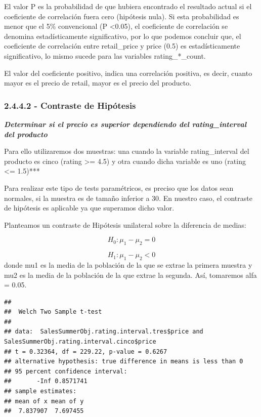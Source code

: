 \documentclass[
]{article}
\newenvironment{Shaded}{\begin{snugshade}}{\end{snugshade}}
\newcommand{\DataTypeTok}[1]{\textcolor[rgb]{0.13,0.29,0.53}{#1}}
\newcommand{\KeywordTok}[1]{\textcolor[rgb]{0.13,0.29,0.53}{\textbf{#1}}}
\newcommand{\NormalTok}[1]{#1}
\newcommand{\OperatorTok}[1]{\textcolor[rgb]{0.81,0.36,0.00}{\textbf{#1}}}
\newcommand{\StringTok}[1]{\textcolor[rgb]{0.31,0.60,0.02}{#1}}
\begin{document}
El valor P es la probabilidad de que hubiera encontrado el resultado
actual si el coeficiente de correlación fuera cero (hipótesis nula). Si
esta probabilidad es menor que el 5\% convencional (P \textless0.05), el
coeficiente de correlación se denomina estadísticamente significativo,
por lo que podemos concluir que, el coeficiente de correlación entre
retail\_price y price (0.5) es estadísticamente significativo, lo mismo
sucede para las variables rating\_*\_count.

El valor del coeficiente positivo, indica una correlación positiva, es
decir, cuanto mayor es el precio de retail, mayor es el precio del
producto.

\hypertarget{contraste-de-hipuxf3tesis}{%
\subsubsection{2.4.4.2 - Contraste de
Hipótesis}\label{contraste-de-hipuxf3tesis}}

\textbf{\emph{Determinar si el precio es superior dependiendo del
rating\_interval del producto}}

Para ello utilizaremos dos muestras: una cuando la variable
rating\_interval del producto es cinco (rating \textgreater= 4.5) y otra
cuando dicha variable es uno (rating \textless= 1.5)***

Para realizar este tipo de tests paramétricos, es preciso que los datos
sean normales, si la muestra es de tamaño inferior a 30. En nuestro
caso, el contraste de hipótesis es aplicable ya que superamos dicho
valor.

Planteamos un contraste de Hipótesis unilateral sobre la diferencia de
medias:

\[
  H_{0}: \mu_{1} - \mu_{2} = 0
\]

\[
  H_{1}: \mu_{1} - \mu_{2} < 0
\] donde mu1 es la media de la población de la que se extrae la primera
muestra y mu2 es la media de la población de la que extrae la segunda.
Así, tomaremos alfa = 0.05.

\begin{Shaded}
\end{Shaded}

\begin{verbatim}
## 
##  Welch Two Sample t-test
## 
## data:  SalesSummerObj.rating.interval.tres$price and SalesSummerObj.rating.interval.cinco$price
## t = 0.32364, df = 229.22, p-value = 0.6267
## alternative hypothesis: true difference in means is less than 0
## 95 percent confidence interval:
##       -Inf 0.8571741
## sample estimates:
## mean of x mean of y 
##  7.837907  7.697455
\end{verbatim}
\end{document}
